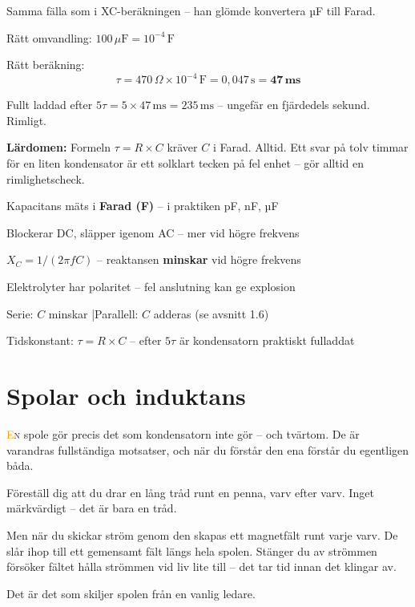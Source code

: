 \documentclass[a4paper,11pt,twoside]{book}
\newcommand{\emoji}[1]{{\emojifont #1}}
\begin{document}
\begin{worked}[title={Lösning -- Fallgropsfråga 1.4.4\,F}]
Samma fälla som i XC-beräkningen -- han glömde konvertera 
µF till Farad.

Rätt omvandling: $100\,\mu\text{F} = 10^{-4}\,\text{F}$

Rätt beräkning:
\[
\tau = 470\,\Omega \times 10^{-4}\,\text{F} = 0{,}047\,\text{s} = \mathbf{47\,\text{ms}}
\]

Fullt laddad efter $5\tau = 5 \times 47\,\text{ms} = 235\,\text{ms}$ -- 
ungefär en fjärdedels sekund. Rimligt.

\textbf{Lärdomen:} Formeln $\tau = R \times C$ kräver $C$ 
i Farad. Alltid. Ett svar på tolv timmar för en liten 
kondensator är ett solklart tecken på fel enhet -- gör 
alltid en rimlighetscheck.
\end{worked}

\begin{orangebox}[title={\emoji{🎯} Viktigt för provet}]
\begin{checklist}
  \item Kapacitans mäts i \textbf{Farad (F)} -- i praktiken pF, nF, µF
  \item Blockerar DC, släpper igenom AC -- mer vid högre frekvens
  \item $X_C = 1/(2\pi fC)$ -- reaktansen \textbf{minskar} vid högre frekvens
  \item Elektrolyter har polaritet -- fel anslutning kan ge explosion
  \item Serie: $C$ minskar \quad|\quad Parallell: $C$ adderas (se avsnitt 1.6)
  \item Tidskonstant: $\tau = R \times C$ -- efter $5\tau$ är kondensatorn praktiskt fulladdat
\end{checklist}
\end{orangebox}

\section{Spolar och induktans}

\lettrine[lines=2]{\textcolor{orange}{E}}{n} spole gör precis det som kondensatorn inte gör -- och tvärtom. De är varandras fullständiga motsatser, och när du förstår den ena förstår du egentligen båda.

\begin{storybox}[{\emoji{🌀} Tråden som minns}]
Föreställ dig att du drar en lång tråd runt en penna, varv 
efter varv. Inget märkvärdigt -- det är bara en tråd.

Men när du skickar ström genom den skapas ett magnetfält 
runt varje varv. De slår ihop till ett gemensamt fält längs 
hela spolen. Stänger du av strömmen försöker fältet hålla 
strömmen vid liv lite till -- det tar tid innan det klingar 
av.

Det är det som skiljer spolen från en vanlig ledare.
\end{storybox}
\end{document}
